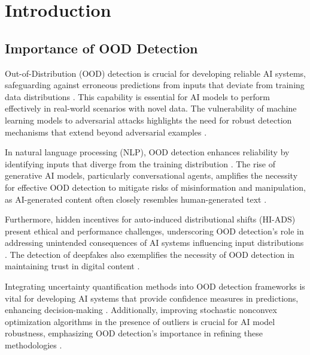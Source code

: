 \section{Introduction} \label{sec:Introduction}



\subsection{Importance of OOD Detection} \label{subsec:Importance of OOD Detection}

Out-of-Distribution (OOD) detection is crucial for developing reliable AI systems, safeguarding against erroneous predictions from inputs that deviate from training data distributions \cite{HowGoodAre3,Delvingint2}. This capability is essential for AI models to perform effectively in real-world scenarios with novel data. The vulnerability of machine learning models to adversarial attacks highlights the need for robust detection mechanisms that extend beyond adversarial examples \cite{arous2023noiseyouadversarialtraining}.

In natural language processing (NLP), OOD detection enhances reliability by identifying inputs that diverge from the training distribution \cite{lang2023survey}. The rise of generative AI models, particularly conversational agents, amplifies the necessity for effective OOD detection to mitigate risks of misinformation and manipulation, as AI-generated content often closely resembles human-generated text \cite{islam2023distinguishinghumangeneratedtext}.

Furthermore, hidden incentives for auto-induced distributional shifts (HI-ADS) present ethical and performance challenges, underscoring OOD detection's role in addressing unintended consequences of AI systems influencing input distributions \cite{krueger2020hiddenincentivesautoinduceddistributional}. The detection of deepfakes also exemplifies the necessity of OOD detection in maintaining trust in digital content \cite{cao2021understandingsecuritydeepfakedetection}.

Integrating uncertainty quantification methods into OOD detection frameworks is vital for developing AI systems that provide confidence measures in predictions, enhancing decision-making \cite{walz2023easyuncertaintyquantificationeasyuq}. Additionally, improving stochastic nonconvex optimization algorithms in the presence of outliers is crucial for AI model robustness, emphasizing OOD detection's importance in refining these methodologies \cite{li2024robustsecondordernonconvexoptimization}.

